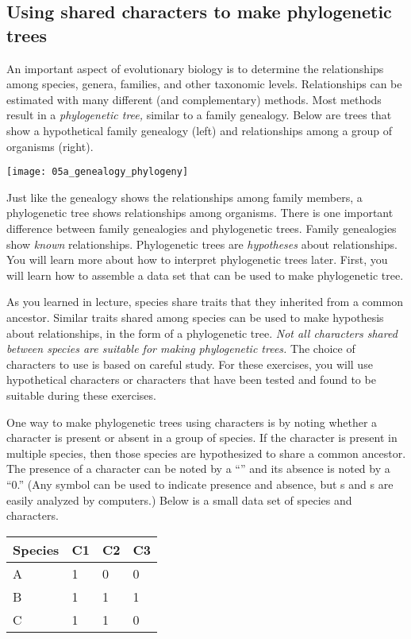 \documentclass[12pt, hidelinks]{exam}
\begin{document}
\subsection*{Using shared characters to make phylogenetic trees}

An important aspect of evolutionary biology is to determine the relationships among species, genera, families, and other taxonomic levels. Relationships can be estimated with many different (and complementary) methods.  Most methods result in a \emph{phylogenetic tree,} similar to a family genealogy. Below are trees that show a hypothetical family genealogy (left) and relationships among a group of organisms (right). 

\begin{center}
	\texttt{[image: 05a\_genealogy\_phylogeny]}
\end{center}

Just like the genealogy shows the relationships among family members, a phylogenetic tree shows relationships among organisms.  There is one important difference between family genealogies and phylogenetic trees. Family genealogies show \emph{known} relationships. Phylogenetic trees are \emph{hypotheses} about relationships. You will learn more about how to interpret phylogenetic trees later. First, you will learn how to assemble a data set that can be used to make phylogenetic tree.

As you learned in lecture, species share traits that they inherited from a common ancestor. Similar traits shared among species can be used to make hypothesis about relationships, in the form of a phylogenetic tree. \emph{Not all characters shared between species are suitable for making phylogenetic trees.} The choice of characters to use is based on careful study. For these exercises, you will use hypothetical characters or characters that have been tested and found to be suitable during these exercises.

One way to make phylogenetic trees using characters is by noting whether a character is present or absent in a group of species. If the character is present in multiple species, then those species are hypothesized to share a common ancestor.  The presence of a character can be noted by a “{” and its absence is noted by a “0}.” (Any symbol can be used to indicate presence and absence, but {}s and {}s are easily analyzed by computers.) Below is a small data set of species and characters.

{\liningnum
\begin{center}
	\begin{tabular}{llll}
	\toprule
		Species	&	C1	&	C2	&	C3	\tabularnewline
	\midrule
		A	&	1	&	0	&	0	\tabularnewline
		B	&	1	&	1	&	1	\tabularnewline
		C	& 1	&	1	&	0	\tabularnewline
	\bottomrule
	\end{tabular}
\end{center}
}
\end{document}
